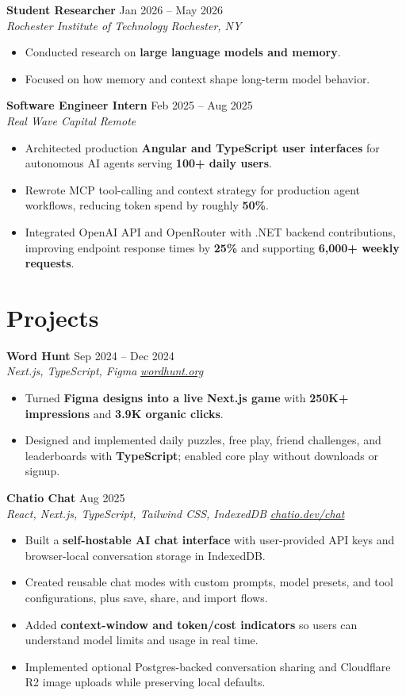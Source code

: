 \documentclass[10pt,letterpaper]{article}
\newif\ifresumeFirstRole
\newcommand{\resumeRole}[4]{%
  \ifresumeFirstRole
    \global\resumeFirstRolefalse
  \else
    \vspace{0pt plus 1fill}%
  \fi
  \textbf{#1} \hfill #2\\
  \textit{#3} \hfill \textit{#4}
}
\begin{document}
\resumeRole{Student Researcher}{Jan 2026 -- May 2026}{Rochester Institute of Technology}{Rochester, NY}
\begin{itemize}
  \item Conducted research on \textbf{large language models and memory}.
  \item Focused on how memory and context shape long-term model behavior.
\end{itemize}

\resumeRole{Software Engineer Intern}{Feb 2025 -- Aug 2025}{Real Wave Capital}{Remote}
\begin{itemize}
  \item Architected production \textbf{Angular and TypeScript user interfaces} for autonomous AI agents serving \textbf{100+ daily users}.
  \item Rewrote MCP tool-calling and context strategy for production agent workflows, reducing token spend by roughly \textbf{50\%}.
  \item Integrated OpenAI API and OpenRouter with .NET backend contributions, improving endpoint response times by \textbf{25\%} and supporting \textbf{6,000+ weekly requests}.
\end{itemize}

\section*{Projects}
\resumeRole{Word Hunt}{Sep 2024 -- Dec 2024}{Next.js, TypeScript, Figma}{\href{https://wordhunt.org}{wordhunt.org}}
\begin{itemize}
  \item Turned \textbf{Figma designs into a live Next.js game} with \textbf{250K+ impressions} and \textbf{3.9K organic clicks}.
  \item Designed and implemented daily puzzles, free play, friend challenges, and leaderboards with \textbf{TypeScript}; enabled core play without downloads or signup.
\end{itemize}

\resumeRole{Chatio Chat}{Aug 2025}{React, Next.js, TypeScript, Tailwind CSS, IndexedDB}{\href{https://chatio.dev/chat}{chatio.dev/chat}}
\begin{itemize}
  \item Built a \textbf{self-hostable AI chat interface} with user-provided API keys and browser-local conversation storage in IndexedDB.
  \item Created reusable chat modes with custom prompts, model presets, and tool configurations, plus save, share, and import flows.
  \item Added \textbf{context-window and token/cost indicators} so users can understand model limits and usage in real time.
  \item Implemented optional Postgres-backed conversation sharing and Cloudflare R2 image uploads while preserving local defaults.
\end{itemize}
\end{document}
